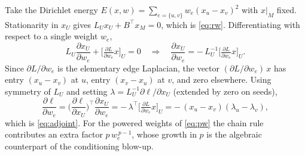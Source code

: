 \documentclass[11pt,a4paper]{article}
\newcommand{\Lap}{L}
\newcommand{\LU}{\Lap_{U}}
\newcommand{\xU}{x_{U}}
\newcommand{\xM}{x_{M}}
\newcommand{\we}{w_{e}}
\theoremstyle{definition}
\begin{document}
Take the Dirichlet energy $E(x,w) = \sum_{e=\{u,v\}} \we (x_u-x_v)^2$
with $x|_{M}$ fixed. Stationarity in $\xU$ gives
$\LU \xU + B^{\!\top}\xM = 0$, which is \eqref{eq:rw}. Differentiating
with respect to a single weight $\we$,
\begin{equation}
  \LU \frac{\partial \xU}{\partial \we}
  + \Big[\tfrac{\partial \Lap}{\partial \we} x\Big]_{U} = 0
  \quad\Longrightarrow\quad
  \frac{\partial \xU}{\partial \we}
  = -\,\LU^{-1}\Big[\tfrac{\partial \Lap}{\partial \we} x\Big]_{U}.
\end{equation}
Since $\partial \Lap/\partial \we$ is the elementary edge Laplacian,
the vector $(\partial \Lap/\partial \we)\,x$ has entry $(x_u - x_v)$ at
$u$, entry $(x_v - x_u)$ at $v$, and zero elsewhere. Using symmetry of
$\LU$ and setting $\lambda = \LU^{-1}\partial\ell/\partial\xU$ (extended
by zero on seeds),
\begin{equation}
  \frac{\partial \ell}{\partial \we}
  = \Big(\frac{\partial \ell}{\partial \xU}\Big)^{\!\top}
    \frac{\partial \xU}{\partial \we}
  = -\,\lambda^{\!\top}\Big[\tfrac{\partial \Lap}{\partial \we} x\Big]_{U}
  = -\,(x_u - x_v)(\lambda_u - \lambda_v),
\end{equation}
which is \eqref{eq:adjoint}. For the powered weights of \eqref{eq:pw} the
chain rule contributes an extra factor $p\,\we^{\,p-1}$, whose growth in
$p$ is the algebraic counterpart of the conditioning blow-up.



\end{document}
